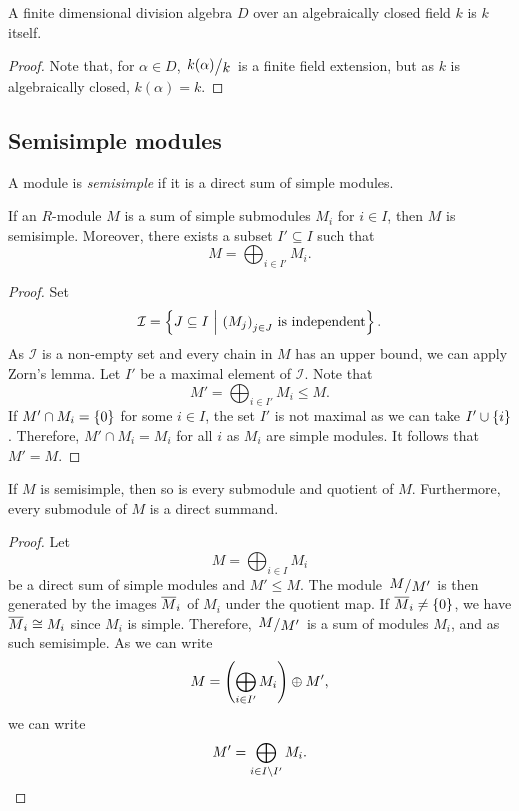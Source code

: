 \begin{lema}
A finite dimensional division algebra $D$ over an algebraically
closed field $k$ is $k$ itself.
\end{lema}

\begin{proof}
Note that, for $\alpha \in D$, $\kvoc{k(\alpha)}{k}$ is a finite
field extension, but as $k$ is algebraically closed,
$k(\alpha) = k$.
\end{proof}

\newpage

\subsection{Semisimple modules}

\begin{definicija}
A module is \emph{semisimple} if it is a
direct sum of simple modules.
\end{definicija}

\begin{trditev}
If an $R$-module $M$ is a sum of simple submodules $M_i$ for
$i \in I$, then $M$ is semisimple. Moreover, there exists a subset
$I' \subseteq I$ such that
\[
M = \bigoplus_{i \in I'} M_i.
\]
\end{trditev}

\begin{proof}
Set
\[
\mathcal{I} =
\left\{J \subseteq I~\middle\vert~\text{$\left(M_j\right)_{j \in J}$ is independent}\right\}.
\]
As $\mathcal{I}$ is a non-empty set and every chain in $M$ has an
upper bound, we can apply Zorn's lemma. Let $I'$ be a maximal
element of $\mathcal{I}$. Note that
\[
M' = \bigoplus_{i \in I'} M_i \leq M.
\]
If $M' \cap M_i = \left\{0\right\}$ for some $i \in I$, the set $I'$ is not
maximal as we can take $I' \cup \left\{i\right\}$. Therefore,
$M' \cap M_i = M_i$ for all $i$ as $M_i$ are simple modules. It
follows that $M' = M$.
\end{proof}

\begin{posledica}
If $M$ is semisimple, then so is every submodule and quotient of
$M$. Furthermore, every submodule of $M$ is a direct summand.
\end{posledica}

\begin{proof}
Let
\[
M = \bigoplus_{i \in I} M_i
\]
be a direct sum of simple modules and $M' \leq M$. The module
$\kvoc{M}{M'}$ is then generated by the images $\overline{M}_i$ of
$M_i$ under the quotient map. If $\overline{M}_i \ne \left\{0\right\}$, we have
$\overline{M}_i \cong M_i$ since $M_i$ is simple. Therefore,
$\kvoc{M}{M'}$ is a sum of modules $M_i$, and as such semisimple.
As we can write
\[
M = \left(\bigoplus_{i \in I'} M_i\right) \oplus M',
\]
we can write
\[
M' = \bigoplus_{i \in I \setminus I'} M_i. \qedhere
\]
\end{proof}

